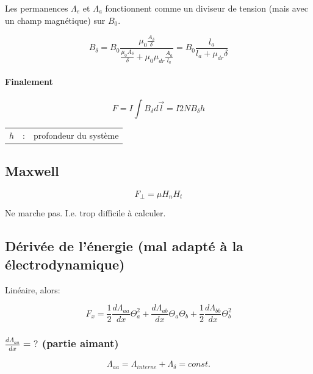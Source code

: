\documentclass[a4paper,12pt,notitlepage]{article}
\begin{document}
    Les permanences $ \Lambda_e $ et $ \Lambda_a $ fonctionnent comme un diviseur
    de tension (mais avec un champ magnétique) sur $ B_0 $.

    \begin{equation}
        B_{\delta} = B_0 \frac{\mu_0 \frac{A_{\delta}}{\delta}}
                {\frac{\mu_0 A_{\delta}}{\delta} + \mu_0 \mu_{dr} \frac{A_a}{l_a}}    
                = B_0 \frac{l_a}{l_a + \mu_{dr} \delta}
    \end{equation}

    \paragraph{Finalement}
    \begin{equation}
        F = I \int B_{\delta} d \vec{l} = I 2 N B_{\delta} h
    \end{equation}

    \begin{table}[H]
        \begin{tabular}{c c l}
            $ h $ & : & profondeur du système \\
        \end{tabular}
    \end{table}


    \subsection{Maxwell}
    \begin{equation}
        F_{\perp} = \mu H_n H_t
    \end{equation}

    Ne marche pas. I.e. trop difficile à calculer.


    \subsection{Dérivée de l'énergie (mal adapté à la électrodynamique)}
    Linéaire, alors:

    \begin{equation}
        F_x = \frac{1}{2} \frac{d\Lambda_{aa}}{dx}\Theta_a^2
        + \frac{d\Lambda_{ab}}{dx}\Theta_a \Theta_b
        + \frac{1}{2} \frac{d\Lambda_{bb}}{dx}\Theta_b^2
    \end{equation}

    \subsubsection{$ \frac{d\Lambda_{aa}}{dx} = ?$ (partie aimant)}
    \begin{equation}
        \Lambda_{aa} = \Lambda_{interne} + \Lambda_{\delta} = const.
    \end{equation}
\end{document}
